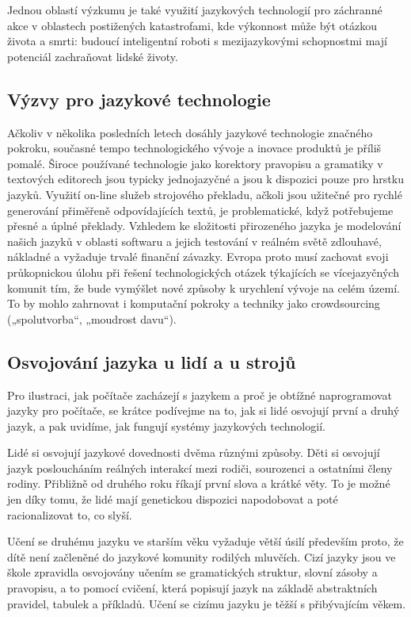 \documentclass[]{../../metanetpaper}
\begin{document}
\begin{multicols}{2}
Jednou oblastí výzkumu je také využití jazykových technologií pro záchranné akce v oblastech postižených katastrofami, kde výkonnost může být otázkou života a smrti: budoucí inteligentní roboti s mezijazykovými schopnostmi mají potenciál zachraňovat lidské životy.

\subsection{Výzvy pro jazykové technologie}

Ačkoliv v několika posledních letech dosáhly jazykové technologie značného pokroku, současné tempo technologického vývoje a inovace produktů je příliš pomalé. Široce používané technologie jako korektory pravopisu a gramatiky v textových editorech jsou typicky jednojazyčné a jsou k dispozici pouze pro hrstku jazyků. Využití on-line služeb strojového překladu, ačkoli jsou užitečné pro rychlé generování přiměřeně odpovídajících textů, je problematické, když potřebujeme přesné a úplné překlady. Vzhledem ke složitosti přirozeného jazyka je modelování našich jazyků v oblasti softwaru a jejich testování v reálném světě zdlouhavé, nákladné a vyžaduje trvalé finanční závazky. Evropa proto musí zachovat svoji průkopnickou úlohu při řešení technologických otázek týkajících se vícejazyčných komunit tím, že bude vymýšlet nové způsoby k urychlení vývoje na celém území. To by mohlo zahrnovat i komputační pokroky a techniky jako crowdsourcing („spolutvorba“, „moudrost davu“).

\subsection{Osvojování jazyka u lidí a u strojů}

Pro ilustraci, jak počítače zacházejí s jazykem a proč je obtížné naprogramovat jazyky pro počítače, se krátce podívejme na to, jak si lidé osvojují první a druhý jazyk, a pak uvidíme, jak fungují systémy jazykových technologií.

Lidé si osvojují jazykové dovednosti dvěma různými způsoby. Děti si osvojují jazyk posloucháním reálných interakcí mezi rodiči, sourozenci a ostatními členy rodiny. Přibližně od druhého roku říkají první slova a krátké věty. To je možné jen díky tomu, že lidé mají genetickou dispozici napodobovat a poté racionalizovat to, co slyší.

Učení se druhému jazyku ve starším věku vyžaduje větší úsilí především proto, že dítě není začleněné do jazykové komunity rodilých mluvčích. Cizí jazyky jsou ve škole zpravidla osvojovány učením se gramatických struktur, slovní zásoby a pravopisu, a to pomocí cvičení, která popisují jazyk na základě abstraktních pravidel, tabulek a příkladů. Učení se cizímu jazyku je těžší s přibývajícím věkem.


\end{multicols}
\end{document}
